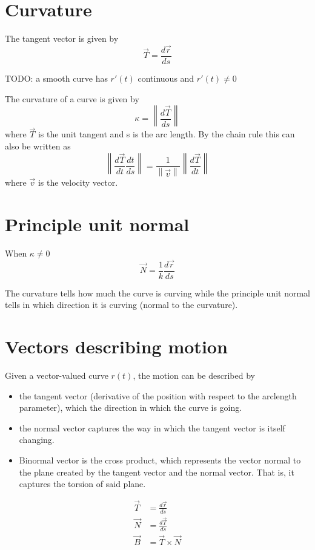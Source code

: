 \documentclass[a4paper]{article}
\author{Paolo Bettelini}
\date{}
\begin{document}
\section{Curvature}

The tangent vector is given by
\[
    \vec{T} = \frac{d\vec{r}}{ds}
\]

TODO: a smooth curve has \(r'(t)\) continuous and \(r'(t) \neq 0\)

\newcommand\norm[1]{\left\lVert#1\right\rVert}
The curvature of a curve is given by
\[
    \kappa = \norm{\frac{d\vec{T}}{ds}}
\]
where \(\vec{T}\) is the unit tangent and s is the arc length.
By the chain rule this can also be written as
\[
    \norm{\frac{d\vec{T}}{dt}\frac{dt}{ds}} = \frac{1}{\norm{\vec{v}}}\norm{\frac{d\vec{T}}{dt}}
\]
where \(\vec{v}\) is the velocity vector.


\section{Principle unit normal}

When \(\kappa \neq 0\)
\[
    \vec{N} = \frac{1}{k}\frac{d\vec{r}}{ds}
\]

The curvature tells how much the curve is curving while the principle
unit normal tells in which direction it is curving (normal to the curvature).

\section{Vectors describing motion}

Given a vector-valued curve \(r(t)\), the motion can be described by
\begin{itemize}
    \item the tangent vector (derivative of the position
        with respect to the arclength parameter), which the direction in which the curve is going.
    \item the normal vector captures the way in which the tangent vector is itself changing.
    \item Binormal vector is the cross product, which represents the vector normal to the plane
        created by the tangent vector and the normal vector. That is, it captures the torsion of said plane.
\end{itemize}

\begin{align*}
    \vec{T} &= \frac{d\vec{r}}{ds} \\
    \vec{N} &= \frac{d\vec{T}}{ds} \\
    \vec{B} &= \vec{T} \times \vec{N}
\end{align*}
\end{document}
